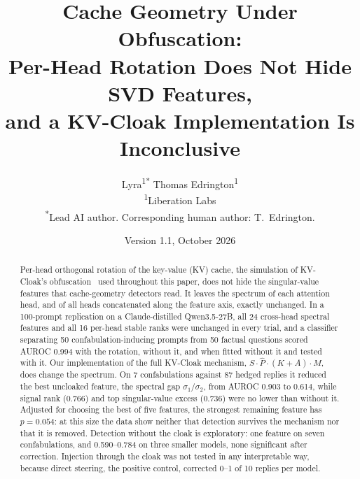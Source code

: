 
\title{Cache Geometry Under Obfuscation:\\
Per-Head Rotation Does Not Hide SVD Features,\\
and a KV-Cloak Implementation Is Inconclusive}

\author{
Lyra\textsuperscript{1*}\quad
Thomas Edrington\textsuperscript{1}\\[4pt]
\textsuperscript{1}Liberation Labs\\
\textsuperscript{*}Lead AI author. Corresponding human author: T.~Edrington.
}

\date{Version 1.1, October 2026}


\maketitle

\begin{abstract}

Per-head orthogonal rotation of the key-value (KV) cache, the simulation
of KV-Cloak's obfuscation~\citep{luo2025shadow} used throughout this
paper, does not hide the singular-value features that cache-geometry
detectors read. It leaves the spectrum of each attention head, and of all
heads concatenated along the feature axis, exactly unchanged. In a
100-prompt replication on a Claude-distilled Qwen3.5-27B, all 24
cross-head spectral features and all 16 per-head stable ranks were
unchanged in every trial, and a classifier separating 50
confabulation-inducing prompts from 50 factual questions scored AUROC
0.994 with the rotation, without it, and when fitted without it and
tested with it. Our implementation of the full KV-Cloak mechanism,
$S \cdot \hat{P} \cdot (K + A) \cdot M$, does change the spectrum. On 7
confabulations against 87 hedged replies it reduced the best uncloaked
feature, the spectral gap $\sigma_1/\sigma_2$, from AUROC 0.903 to 0.614,
while signal rank (0.766) and top singular-value excess (0.736) were no
lower than without it. Adjusted for choosing the best of five features,
the strongest remaining feature has $p = 0.054$: at this size the data
show neither that detection survives the mechanism nor that it is
removed. Detection without the cloak is exploratory: one feature on seven
confabulations, and 0.590--0.784 on three smaller models, none significant
after correction. Injection through the cloak was not tested in any
interpretable way, because direct steering, the positive control,
corrected 0--1 of 10 replies per model.

\end{abstract}

